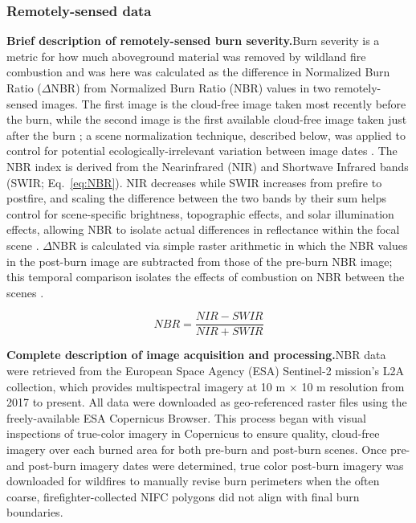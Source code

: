 \documentclass[fire,article,submit,oneauthor,pdftex]{Definitions/mdpi}
\begin{document}
\subsubsection{Remotely-sensed data}

\textbf{Brief description of remotely-sensed burn severity.\textemdash}Burn severity is a metric for how much aboveground material was removed by wildland fire combustion and was here was calculated as the difference in Normalized Burn Ratio ($\Delta$NBR) from Normalized Burn Ratio (NBR) values in two remotely-sensed images. 
The first image is the cloud-free image taken most recently before the burn, while the second image is the first available cloud-free image taken just after the burn \cite[e.g.,][]{llorens2021}; a scene normalization technique, described below, was applied to control for potential ecologically-irrelevant variation between image dates \cite{key2006a}.
The NBR index is derived from the Nearinfrared (NIR) and Shortwave Infrared bands (SWIR; Eq.~\ref{eq:NBR}). 
NIR decreases while SWIR increases from prefire to postfire, and scaling the difference between the two bands by their sum helps control for scene-specific brightness, topographic effects, and solar illumination effects, allowing NBR to isolate actual differences in reflectance within the focal scene \cite{key2006a}.  
$\Delta$NBR is calculated via simple raster arithmetic in which the NBR values in the post-burn image are subtracted from those of the pre-burn NBR image; this temporal comparison isolates the effects of combustion on NBR between the scenes \cite{key2006a}. 

\begin{linenomath}
	\begin{equation}
	NBR = \frac{NIR - SWIR}{NIR + SWIR}
	\label{eq:NBR}
	\end{equation}
\end{linenomath}

\textbf{Complete description of image acquisition and processing.\textemdash}NBR data were retrieved from the European Space Agency (ESA) Sentinel-2 mission's L2A collection, which provides multispectral imagery at 10 m $\times$ 10 m resolution from 2017 to present. 
All data were downloaded as geo-referenced raster files using the freely-available ESA Copernicus Browser. 
This process began with visual inspections of true-color imagery in Copernicus to ensure quality, cloud-free imagery over each burned area for both pre-burn and post-burn scenes. 
Once pre- and post-burn imagery dates were determined, true color post-burn imagery was downloaded for wildfires to manually revise burn perimeters when the often coarse, firefighter-collected NIFC polygons did not align with final burn boundaries. 
\end{document}
